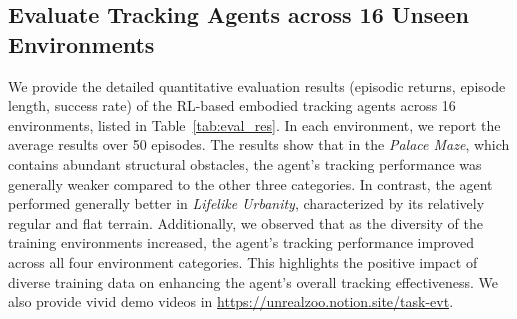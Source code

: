 \subsection{Evaluate Tracking Agents across 16 Unseen Environments}
\label{app:track16}
We provide the detailed quantitative evaluation results (episodic returns, episode length, success rate) of the RL-based embodied tracking agents across 16 environments, listed in Table~\ref{tab:eval_res}. In each environment, we report the average results over 50 episodes. The results show that in the \textit{Palace Maze}, which contains abundant structural obstacles, the agent's tracking performance was generally weaker compared to the other three categories. In contrast, the agent performed generally better in \textit{Lifelike Urbanity}, characterized by its relatively regular and flat terrain. Additionally, we observed that as the diversity of the training environments increased, the agent's tracking performance improved across all four environment categories. This highlights the positive impact of diverse training data on enhancing the agent's overall tracking effectiveness. We also provide vivid demo videos in \url{https://unrealzoo.notion.site/task-evt}.

